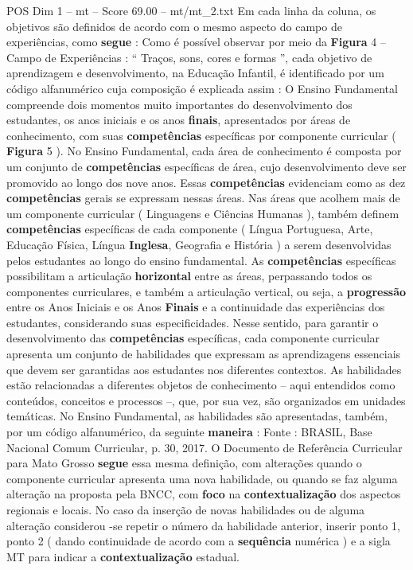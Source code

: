 \begin{textsample}{POS Dim 1 – mt – Score 69.00 – mt/mt\_2.txt}
Em cada linha da coluna, os objetivos são definidos de acordo com o mesmo aspecto do campo de experiências, como \textbf{segue} : Como é possível observar por meio da \textbf{Figura} 4 – Campo de Experiências : “ Traços, sons, cores e formas ”, cada objetivo de aprendizagem e desenvolvimento, na Educação Infantil, é identificado por um código alfanumérico cuja composição é explicada assim : O Ensino Fundamental compreende dois momentos muito importantes do desenvolvimento dos estudantes, os anos iniciais e os anos \textbf{finais}, apresentados por áreas de conhecimento, com suas \textbf{competências} específicas por componente curricular ( \textbf{Figura} 5 ).
No Ensino Fundamental, cada área de conhecimento é composta por um conjunto de \textbf{competências} específicas de área, cujo desenvolvimento deve ser promovido ao longo dos nove anos.
Essas \textbf{competências} evidenciam como as dez \textbf{competências} gerais se expressam nessas áreas.
Nas áreas que acolhem mais de um componente curricular ( Linguagens e Ciências Humanas ), também definem \textbf{competências} específicas de cada componente ( Língua Portuguesa, Arte, Educação Física, Língua \textbf{Inglesa}, Geografia e História ) a serem desenvolvidas pelos estudantes ao longo do ensino fundamental.
As \textbf{competências} específicas possibilitam a articulação \textbf{horizontal} entre as áreas, perpassando todos os componentes curriculares, e também a articulação vertical, ou seja, a \textbf{progressão} entre os Anos Iniciais e os Anos \textbf{Finais} e a continuidade das experiências dos estudantes, considerando suas especificidades.
Nesse sentido, para garantir o desenvolvimento das \textbf{competências} específicas, cada componente curricular apresenta um conjunto de habilidades que expressam as aprendizagens essenciais que devem ser garantidas aos estudantes nos diferentes contextos.
As habilidades estão relacionadas a diferentes objetos de conhecimento – aqui entendidos como conteúdos, conceitos e processos –, que, por sua vez, são organizados em unidades temáticas.
No Ensino Fundamental, as habilidades são apresentadas, também, por um código alfanumérico, da seguinte \textbf{maneira} : Fonte : BRASIL, Base Nacional Comum Curricular, p. 30, 2017.
O Documento de Referência Curricular para Mato Grosso \textbf{segue} essa mesma definição, com alterações quando o componente curricular apresenta uma nova habilidade, ou quando se faz alguma alteração na proposta pela BNCC, com \textbf{foco} na \textbf{contextualização} dos aspectos regionais e locais.
No caso da inserção de novas habilidades ou de alguma alteração considerou -se repetir o número da habilidade anterior, inserir ponto 1, ponto 2 ( dando continuidade de acordo com a \textbf{sequência} numérica ) e a sigla MT para indicar a \textbf{contextualização} estadual.

\end{textsample}
